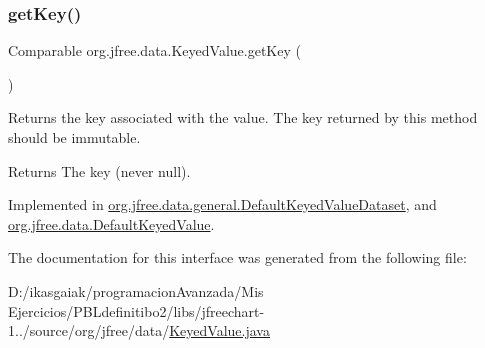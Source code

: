 \subsubsection{\texorpdfstring{get\+Key()}{getKey()}}
{\footnotesize\ttfamily Comparable org.\+jfree.\+data.\+Keyed\+Value.\+get\+Key (\begin{DoxyParamCaption}{ }\end{DoxyParamCaption})}

Returns the key associated with the value. The key returned by this method should be immutable.

\begin{DoxyReturn}{Returns}
The key (never {\ttfamily null}). 
\end{DoxyReturn}


Implemented in \mbox{\hyperlink{classorg_1_1jfree_1_1data_1_1general_1_1_default_keyed_value_dataset_a295e1097c6ecf63b20cb1de7570aebd0}{org.\+jfree.\+data.\+general.\+Default\+Keyed\+Value\+Dataset}}, and \mbox{\hyperlink{classorg_1_1jfree_1_1data_1_1_default_keyed_value_a5f0bfcf7b9c134922523b70e19bb69ee}{org.\+jfree.\+data.\+Default\+Keyed\+Value}}.



The documentation for this interface was generated from the following file\+:\begin{DoxyCompactItemize}
\item 
D\+:/ikasgaiak/programacion\+Avanzada/\+Mis Ejercicios/\+P\+B\+Ldefinitibo2/libs/jfreechart-\/1../source/org/jfree/data/\mbox{\hyperlink{_keyed_value_8java}{Keyed\+Value.\+java}}\end{DoxyCompactItemize}
